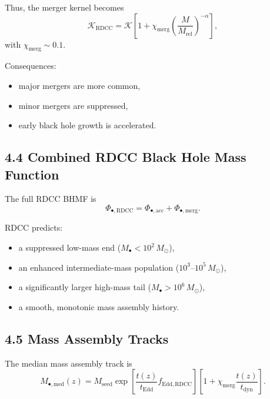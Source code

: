 \documentclass[11pt,a4paper]{article}
\begin{document}
Thus, the merger kernel becomes
\begin{equation}
    \mathcal{K}_{\mathrm{RDCC}}
    = \mathcal{K}
      \left[
        1 + \chi_{\mathrm{merg}}
        \left(\frac{M}{M_{\mathrm{rel}}}\right)^{-\alpha}
      \right],
\end{equation}
with $\chi_{\mathrm{merg}} \sim 0.1$.

Consequences:

\begin{itemize}
    \item major mergers are more common,
    \item minor mergers are suppressed,
    \item early black hole growth is accelerated.
\end{itemize}

\subsection*{4.4 Combined RDCC Black Hole Mass Function}

The full RDCC BHMF is
\begin{equation}
    \Phi_{\bullet,\mathrm{RDCC}}
    = \Phi_{\bullet,\mathrm{acc}}
    + \Phi_{\bullet,\mathrm{merg}}.
\end{equation}

RDCC predicts:

\begin{itemize}
    \item a suppressed low-mass end ($M_{\bullet} < 10^{2}\,M_{\odot}$),
    \item an enhanced intermediate-mass population ($10^{3}$–$10^{5}\,M_{\odot}$),
    \item a significantly larger high-mass tail ($M_{\bullet} > 10^{6}\,M_{\odot}$),
    \item a smooth, monotonic mass assembly history.
\end{itemize}

\subsection*{4.5 Mass Assembly Tracks}

The median mass assembly track is
\begin{equation}
    M_{\bullet,\mathrm{med}}(z)
    = M_{\mathrm{seed}}
      \exp\!\left[
        \frac{t(z)}{t_{\mathrm{Edd}}}
        f_{\mathrm{Edd,RDCC}}
      \right]
      \left[
        1 + \chi_{\mathrm{merg}}
        \frac{t(z)}{t_{\mathrm{dyn}}}
      \right].
\end{equation}
\end{document}
